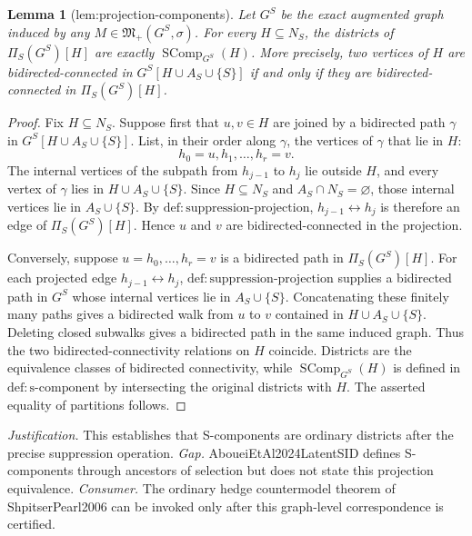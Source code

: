 \documentclass{article}
\newtheorem{lemma}{Lemma}
\begin{document}
\begin{lemma}[lem:projection-components]\label{lem:projection-components}
Let \(G^S\) be the exact augmented graph induced by any \(M\in\mathfrak M_+(G^S,\sigma)\). For every \(H\subseteq N_S\), the districts of \(\Pi_S(G^S)[H]\) are exactly \(\operatorname{SComp}_{G^S}(H)\). More precisely, two vertices of \(H\) are bidirected-connected in \(G^S[H\cup A_S\cup\{S\}]\) if and only if they are bidirected-connected in \(\Pi_S(G^S)[H]\).
\end{lemma}
\begin{proof}
Fix \(H\subseteq N_S\).  Suppose first that \(u,v\in H\) are joined by a bidirected path \(\gamma\) in \(G^S[H\cup A_S\cup\{S\}]\).  List, in their order along \(\gamma\), the vertices of \(\gamma\) that lie in \(H\):
\[
  h_0=u,h_1,\ldots,h_r=v.
\]
The internal vertices of the subpath from \(h_{j-1}\) to \(h_j\) lie outside \(H\), and every vertex of \(\gamma\) lies in \(H\cup A_S\cup\{S\}\).  Since \(H\subseteq N_S\) and \(A_S\cap N_S=\varnothing\), those internal vertices lie in \(A_S\cup\{S\}\).  By \(\mathrm{def:suppression\text{-}projection}\), \(h_{j-1}\leftrightarrow h_j\) is therefore an edge of \(\Pi_S(G^S)[H]\).  Hence \(u\) and \(v\) are bidirected-connected in the projection.

Conversely, suppose \(u=h_0,\ldots,h_r=v\) is a bidirected path in \(\Pi_S(G^S)[H]\).  For each projected edge \(h_{j-1}\leftrightarrow h_j\), \(\mathrm{def:suppression\text{-}projection}\) supplies a bidirected path in \(G^S\) whose internal vertices lie in \(A_S\cup\{S\}\).  Concatenating these finitely many paths gives a bidirected walk from \(u\) to \(v\) contained in \(H\cup A_S\cup\{S\}\).  Deleting closed subwalks gives a bidirected path in the same induced graph.  Thus the two bidirected-connectivity relations on \(H\) coincide.  Districts are the equivalence classes of bidirected connectivity, while \(\operatorname{SComp}_{G^S}(H)\) is defined in \(\mathrm{def:s\text{-}component}\) by intersecting the original districts with \(H\).  The asserted equality of partitions follows.
\end{proof}
\par\smallskip\noindent \textit{Justification.} This establishes that S-components are ordinary districts after the precise suppression operation. \textit{Gap.} AboueiEtAl2024LatentSID defines S-components through ancestors of selection but does not state this projection equivalence. \textit{Consumer.} The ordinary hedge countermodel theorem of ShpitserPearl2006 can be invoked only after this graph-level correspondence is certified.
\end{document}
